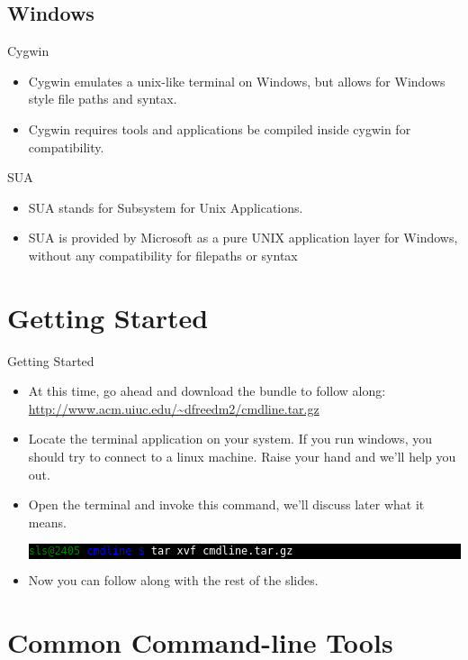 \documentclass[10pt]{beamer}
\makeatletter
\newcommand{\codeblock}[1]
{
  \colorbox{black}{
    \begin{minipage}{\linewidth}
      \texttt{\textcolor{green}{sls@2405} \textcolor{blue}{cmdline \$} \textcolor{white}{#1}}
    \end{minipage}
  }
}
\makeatother
\begin{document}
\subsection{Windows}
\begin{frame}{Cygwin}
\begin{itemize}
\item Cygwin emulates a unix-like terminal on Windows, but allows for Windows style file paths and syntax.
\item Cygwin requires tools and applications be compiled inside cygwin for compatibility.
\end{itemize}
\end{frame}

\begin{frame}{SUA}
\begin{itemize}
\item SUA stands for Subsystem for Unix Applications.
\item SUA is provided by Microsoft as a pure UNIX application layer for Windows, without any compatibility for filepaths or syntax
\end{itemize}
\end{frame}

\section{Getting Started}
\begin{frame}{Getting Started}
\begin{itemize}
  \item At this time, go ahead and download the bundle to follow along: \url{http://www.acm.uiuc.edu/~dfreedm2/cmdline.tar.gz}
  \item Locate the terminal application on your system. If you run windows, you should try to connect to a linux machine. Raise your hand and we'll help you out.
  \item Open the terminal and invoke this command, we'll discuss later what it means.
  \codeblock{tar xvf cmdline.tar.gz}
  \item Now you can follow along with the rest of the slides.
\end{itemize}
\end{frame}

\section{Common Command-line Tools}
\end{document}
